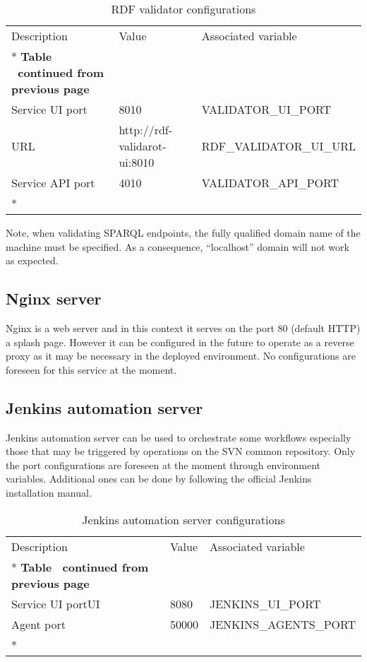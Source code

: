 	\begin{longtable}[c]{@{}p{4cm}p{5cm}l@{}}
		\toprule
		Description & Value & Associated variable \\* \midrule
		\endfirsthead
		\multicolumn{3}{c}%
		{{\bfseries Table \thetable\ continued from previous page}} \\
		\endhead
		\bottomrule
		\endfoot
		\endlastfoot
		Service UI port & 8010 & VALIDATOR\_UI\_PORT \\
		URL & http://rdf-validarot-ui:8010 & RDF\_VALIDATOR\_UI\_URL \\
		Service API port & 4010 & VALIDATOR\_API\_PORT \\* \bottomrule
		\caption{RDF validator configurations}
		\label{tab:my-table3}\\
	\end{longtable}

	Note, when validating SPARQL endpoints, the fully qualified domain name of the machine must be specified. As a consequence, ``localhost'' domain will not work as expected.

	\subsection{Nginx server}
	
	Nginx is a web server and in this context it serves on the port 80 (default HTTP) a splash page. However it can be configured in the future to operate as a reverse proxy as it may be necessary in the deployed environment. No configurations are foreseen for this service at the moment. 
	
	\subsection{Jenkins automation server}
	
	Jenkins automation server can be used to orchestrate some workflows especially those that may be triggered by operations on the SVN common repository. Only the port configurations are foreseen at the moment through environment variables. Additional ones can be done by following the official Jenkins installation manual. 
	
	\begin{longtable}[c]{@{}p{4cm}p{5cm}l@{}}
		\toprule
		Description & Value & Associated variable \\* \midrule
		\endfirsthead
		\multicolumn{3}{c}%
		{{\bfseries Table \thetable\ continued from previous page}} \\
		\endhead
		Service UI portUI & 8080 & JENKINS\_UI\_PORT \\
		Agent port & 50000 & JENKINS\_AGENTS\_PORT \\* \bottomrule
		\caption{Jenkins automation server configurations}
		\label{tab:my-table4}\\
	\end{longtable}
	

